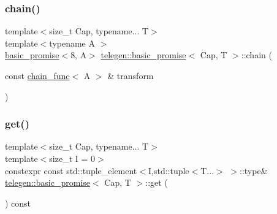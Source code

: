 \subsubsection{\texorpdfstring{chain()}{chain()}}
{\footnotesize\ttfamily template$<$size\+\_\+t Cap, typename... T$>$ \\
template$<$typename A $>$ \\
\hyperlink{classtelegen_1_1basic__promise}{basic\+\_\+promise}$<$8, A$>$ \hyperlink{classtelegen_1_1basic__promise}{telegen\+::basic\+\_\+promise}$<$ Cap, T $>$\+::chain (\begin{DoxyParamCaption}\item[{const \hyperlink{classstdext_1_1inplace__function}{chain\+\_\+func}$<$ A $>$ \&}]{transform }\end{DoxyParamCaption})\hspace{0.3cm}{\ttfamily [inline]}}

\mbox{\label{classtelegen_1_1basic__promise_a8921f7ed33276b0a9c03b9e9df9fe234}} 
\subsubsection{\texorpdfstring{get()}{get()}}
{\footnotesize\ttfamily template$<$size\+\_\+t Cap, typename... T$>$ \\
template$<$size\+\_\+t I = 0$>$ \\
constexpr const std\+::tuple\+\_\+element$<$I,std\+::tuple$<$T...$>$ $>$\+::type\& \hyperlink{classtelegen_1_1basic__promise}{telegen\+::basic\+\_\+promise}$<$ Cap, T $>$\+::get (\begin{DoxyParamCaption}{ }\end{DoxyParamCaption}) const\hspace{0.3cm}{\ttfamily [inline]}}

\mbox{\label{classtelegen_1_1basic__promise_a6443a47f99ebe0c59bcff0d6312e491c}} 
